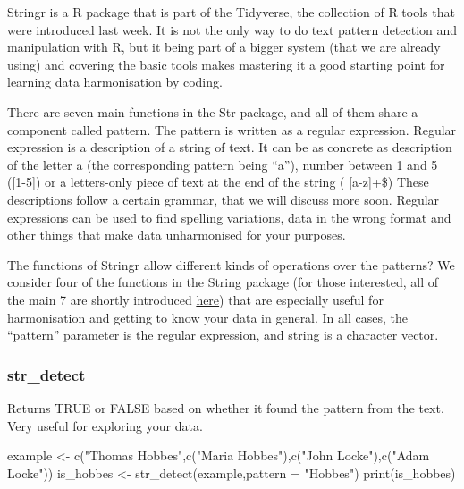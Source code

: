 \documentclass[
]{book}
\newenvironment{Shaded}{\begin{snugshade}}{\end{snugshade}}
\newcommand{\AttributeTok}[1]{\textcolor[rgb]{0.77,0.63,0.00}{#1}}
\newcommand{\FunctionTok}[1]{\textcolor[rgb]{0.00,0.00,0.00}{#1}}
\newcommand{\NormalTok}[1]{#1}
\newcommand{\OtherTok}[1]{\textcolor[rgb]{0.56,0.35,0.01}{#1}}
\newcommand{\StringTok}[1]{\textcolor[rgb]{0.31,0.60,0.02}{#1}}
\begin{document}
Stringr is a R package \citep{Wickham2022} that is part of the Tidyverse, the collection of R tools that were introduced last week. It is not the only way to do text pattern detection and manipulation with R, but it being part of a bigger system (that we are already using) and covering the basic tools makes mastering it a good starting point for learning data harmonisation by coding.

There are seven main functions in the Str package, and all of them share a component called pattern. The pattern is written as a regular expression. Regular expression is a description of a string of text. It can be as concrete as description of the letter a (the corresponding pattern being ``a''), number between 1 and 5 ({[}1-5{]}) or a letters-only piece of text at the end of the string ( {[}a-z{]}+\$) These descriptions follow a certain grammar, that we will discuss more soon. Regular expressions can be used to find spelling variations, data in the wrong format and other things that make data unharmonised for your purposes.

The functions of Stringr allow different kinds of operations over the patterns? We consider four of the functions in the String package (for those interested, all of the main 7 are shortly introduced \href{https://stringr.tidyverse.org/}{here}) that are especially useful for harmonisation and getting to know your data in general. In all cases, the ``pattern'' parameter is the regular expression, and string is a character vector.

\hypertarget{str_detect}{%
\subsubsection{str\_detect}\label{str_detect}}

Returns TRUE or FALSE based on whether it found the pattern from the text. Very useful for exploring your data.

\begin{Shaded}
\begin{Highlighting}[]
\NormalTok{example }\OtherTok{\textless{}{-}} \FunctionTok{c}\NormalTok{(}\StringTok{"Thomas Hobbes"}\NormalTok{,}\FunctionTok{c}\NormalTok{(}\StringTok{"Maria Hobbes"}\NormalTok{),}\FunctionTok{c}\NormalTok{(}\StringTok{"John Locke"}\NormalTok{),}\FunctionTok{c}\NormalTok{(}\StringTok{"Adam Locke"}\NormalTok{))}
\NormalTok{is\_hobbes }\OtherTok{\textless{}{-}} \FunctionTok{str\_detect}\NormalTok{(example,}\AttributeTok{pattern =} \StringTok{"Hobbes"}\NormalTok{)}
\FunctionTok{print}\NormalTok{(is\_hobbes)}
\end{Highlighting}
\end{Shaded}
\end{document}
